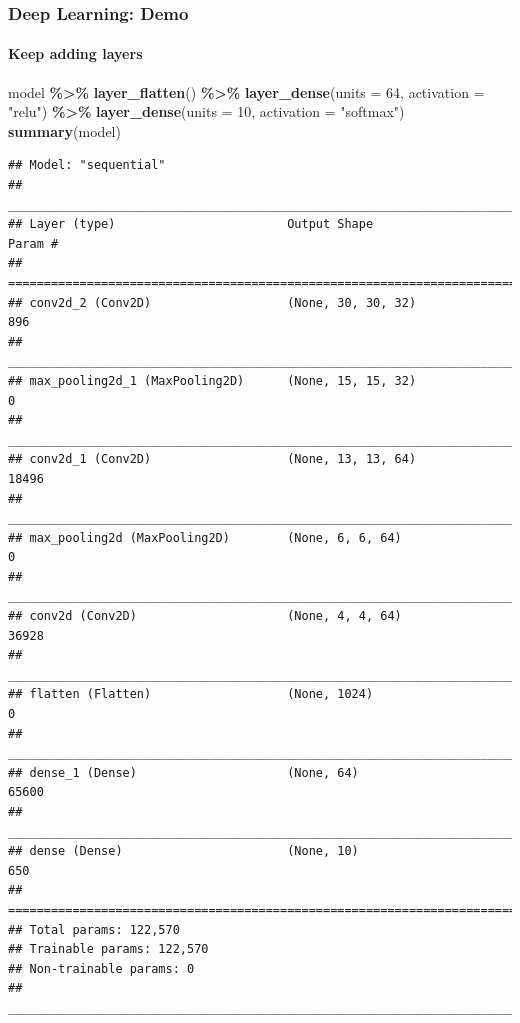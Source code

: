 \documentclass[
  shownotes,
  xcolor={svgnames},
  hyperref={colorlinks,citecolor=DarkBlue,linkcolor=DarkRed,urlcolor=DarkBlue}
  , aspectratio=169]{beamer}
\newenvironment{Shaded}{\begin{snugshade}}{\end{snugshade}}
\newcommand{\DataTypeTok}[1]{\textcolor[rgb]{0.13,0.29,0.53}{#1}}
\newcommand{\DecValTok}[1]{\textcolor[rgb]{0.00,0.00,0.81}{#1}}
\newcommand{\KeywordTok}[1]{\textcolor[rgb]{0.13,0.29,0.53}{\textbf{#1}}}
\newcommand{\NormalTok}[1]{#1}
\newcommand{\OperatorTok}[1]{\textcolor[rgb]{0.81,0.36,0.00}{\textbf{#1}}}
\newcommand{\StringTok}[1]{\textcolor[rgb]{0.31,0.60,0.02}{#1}}
\begin{document}
\begin{frame}[fragile]
\frametitle{Deep Learning: Demo}
\framesubtitle{Keep adding layers}
\begin{scriptsize}
\begin{Shaded}
\begin{Highlighting}[]
\NormalTok{model }\OperatorTok{\%\textgreater{}\%}\StringTok{ }
\StringTok{  }\KeywordTok{layer\_flatten}\NormalTok{() }\OperatorTok{\%\textgreater{}\%}\StringTok{ }
\StringTok{  }\KeywordTok{layer\_dense}\NormalTok{(}\DataTypeTok{units =} \DecValTok{64}\NormalTok{, }\DataTypeTok{activation =} \StringTok{"relu"}\NormalTok{) }\OperatorTok{\%\textgreater{}\%}\StringTok{ }
\StringTok{  }\KeywordTok{layer\_dense}\NormalTok{(}\DataTypeTok{units =} \DecValTok{10}\NormalTok{, }\DataTypeTok{activation =} \StringTok{"softmax"}\NormalTok{)}
\KeywordTok{summary}\NormalTok{(model)}
\end{Highlighting}
\end{Shaded}

\end{scriptsize}
\begin{tiny}


\begin{verbatim}
## Model: "sequential"
## ________________________________________________________________________________
## Layer (type)                        Output Shape                    Param #     
## ================================================================================
## conv2d_2 (Conv2D)                   (None, 30, 30, 32)              896         
## ________________________________________________________________________________
## max_pooling2d_1 (MaxPooling2D)      (None, 15, 15, 32)              0           
## ________________________________________________________________________________
## conv2d_1 (Conv2D)                   (None, 13, 13, 64)              18496       
## ________________________________________________________________________________
## max_pooling2d (MaxPooling2D)        (None, 6, 6, 64)                0           
## ________________________________________________________________________________
## conv2d (Conv2D)                     (None, 4, 4, 64)                36928       
## ________________________________________________________________________________
## flatten (Flatten)                   (None, 1024)                    0           
## ________________________________________________________________________________
## dense_1 (Dense)                     (None, 64)                      65600       
## ________________________________________________________________________________
## dense (Dense)                       (None, 10)                      650         
## ================================================================================
## Total params: 122,570
## Trainable params: 122,570
## Non-trainable params: 0
## ________________________________________________________________________________
\end{verbatim}
\end{tiny}
\end{frame}
\end{document}
